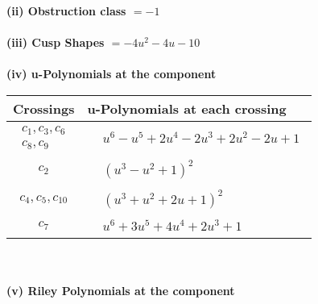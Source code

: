 \documentclass[1p]{elsarticle_modified}
\theoremstyle{definition}
\begin{document}
\flushleft \textbf{(ii) Obstruction class $= -1$}\\~\\
\flushleft \textbf{(iii) Cusp Shapes $= -4 u^2-4 u-10$}\\~\\
\newpage\renewcommand{\arraystretch}{1}
\flushleft \textbf{(iv) u-Polynomials at the component}\newline \\
\begin{tabular}{m{50pt}|m{274pt}}
Crossings & \hspace{64pt}u-Polynomials at each crossing \\
\hline $$\begin{aligned}c_{1},c_{3},c_{6}\\c_{8},c_{9}\end{aligned}$$&$\begin{aligned}
&u^6- u^5+2 u^4-2 u^3+2 u^2-2 u+1
\end{aligned}$\\
\hline $$\begin{aligned}c_{2}\end{aligned}$$&$\begin{aligned}
&(u^3- u^2+1)^2
\end{aligned}$\\
\hline $$\begin{aligned}c_{4},c_{5},c_{10}\end{aligned}$$&$\begin{aligned}
&(u^3+u^2+2 u+1)^2
\end{aligned}$\\
\hline $$\begin{aligned}c_{7}\end{aligned}$$&$\begin{aligned}
&u^6+3 u^5+4 u^4+2 u^3+1
\end{aligned}$\\
\hline
\end{tabular}\\~\\
\newpage\renewcommand{\arraystretch}{1}
\flushleft \textbf{(v) Riley Polynomials at the component}\newline \\
\end{document}
